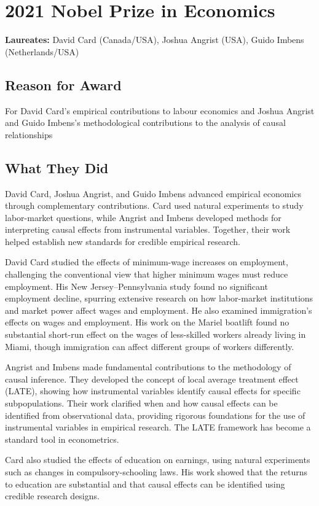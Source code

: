 \chapter{2021 Nobel Prize in Economics}
\textbf{Laureates: }David Card (Canada/USA), Joshua Angrist (USA), Guido Imbens (Netherlands/USA)

\section*{Reason for Award}
For David Card's empirical contributions to labour economics and Joshua Angrist
and Guido Imbens's methodological contributions to the analysis of causal
relationships

\section{What They Did}
David Card, Joshua Angrist, and Guido Imbens advanced empirical economics through
complementary contributions. Card used natural experiments to study labor-market
questions, while Angrist and Imbens developed methods for interpreting causal
effects from instrumental variables. Together, their work helped establish new
standards for credible empirical research.

David Card studied the effects of minimum-wage increases on employment,
challenging the conventional view that higher minimum wages must reduce
employment. His New Jersey--Pennsylvania study found no significant employment
decline, spurring extensive research on how labor-market institutions and market
power affect wages and employment. He also examined immigration's effects on
wages and employment. His work on the Mariel boatlift found no substantial
short-run effect on the wages of less-skilled workers already living in Miami,
though immigration can affect different groups of workers differently.

Angrist and Imbens made fundamental contributions to the methodology of
causal inference. They developed the concept of local average treatment
effect (LATE), showing how instrumental variables identify causal effects
for specific subpopulations. Their work clarified when and how causal
effects can be identified from observational data, providing rigorous
foundations for the use of instrumental variables in empirical research.
The LATE framework has become a standard tool in econometrics.

Card also studied the effects of education on earnings, using natural
experiments such as changes in compulsory-schooling laws.
His work showed that the returns to education are substantial and that
causal effects can be identified using credible research designs.

